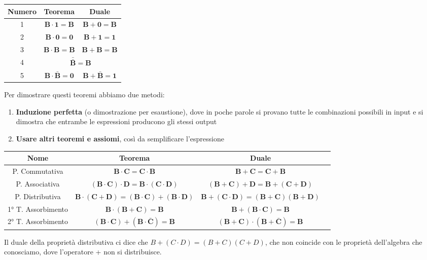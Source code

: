 \documentclass[11pt, a4paper, titlepage, oneside]{scrbook}
\begin{document}
\begin{Proprieta}
\label{prop-teoremi-una-variabile}
\begin{center}
\begin{tabular}{|c|c|c|}
    \hline
    \textbf{Numero} & \textbf{Teorema} & \textbf{Duale} \\
    \hline
    1 & $\bm{B \cdot 1 = B}$ & $\bm{B + 0 = B}$ \\
    \hline
    2 & $\bm{B \cdot 0 = 0}$ & $\bm{B + 1 = 1}$ \\
    \hline
    3 & $\bm{B \cdot B = B}$ & $\bm{B + B  = B}$ \\
    \hline
    4 & \multicolumn{2}{c|}{\rule[-1.2ex]{0pt}{4ex} $\bar{\bar{\bm{B}}} \bm{= B}$} \\
    \hline
    5 & $\bm{B \cdot \bar{B} = 0}$ & $\bm{B + \bar{B} = 1}$ \\
    \hline
\end{tabular}
\end{center}
\end{Proprieta}

Per dimostrare questi teoremi abbiamo due metodi:
\begin{enumerate}
    \item \textbf{Induzione perfetta} (o dimostrazione per esaustione), dove in poche parole si provano tutte le combinazioni possibili in input e si dimostra che entrambe le espressioni producono gli stessi output
    \item \textbf{Usare altri teoremi e assiomi}, così da semplificare l'espressione
\end{enumerate}

\begin{Proprieta}
\label{prop-teoremi-piu-variabili}
\begin{center}
\begin{tabular}{|c|c|c|c|}
    \hline
    \textbf{Nome} & \textbf{Teorema} & \textbf{Duale} \\
    \hline
    P. Commutativa & $\bm{B \cdot C = C \cdot B}$ & $\bm{B + C = C + B}$ \\
    \hline
    P. Associativa & $\bm{(B \cdot C) \cdot D = B \cdot (C \cdot D)}$ & $\bm{(B + C) + D = B + (C + D)}$ \\
    \hline
    P. Distributiva & $\bm{B \cdot (C + D) = (B \cdot C) + (B \cdot D)}$ & $\bm{B + (C \cdot D) = (B + C) (B + D)}$ \\
    \hline
    1° T. Assorbimento & $\bm{B \cdot (B + C) = B}$ & $\bm{B + (B \cdot C) = B}$ \\
    \hline
    2° T. Assorbimento & $\bm{(B \cdot C) + (B \cdot \bar{C}) = B}$ & $\bm{(B + C) \cdot (B + \bar{C}) = B}$ \\
    \hline
\end{tabular}
\end{center}
\NB Il duale della proprietà distributiva ci dice che $B + (C \cdot D) = (B + C)(C + D)$, che non coincide con le proprietà dell'algebra che conosciamo, dove l'operatore + non si distribuisce.
\end{Proprieta}
\end{document}
